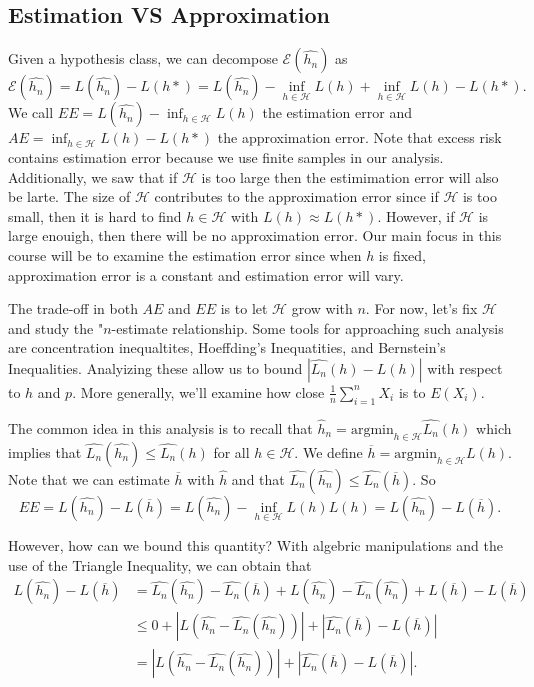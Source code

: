 \documentclass[
]{article}
\begin{document}
\hypertarget{estimation-vs-approximation}{%
\subsection{Estimation VS
Approximation}\label{estimation-vs-approximation}}

Given a hypothesis class, we can decompose \(\mathcal{E}(\hat{h_n})\) as
\[\mathcal{E}(\hat{h_n}) = L(\hat{h_n})- L(h*)=L(\hat{h_n})-\inf_{h \in \mathcal{H}} L(h) + \inf_{h \in \mathcal{H}} L(h) -L(h*).\]
We call \(EE=L(\hat{h_n})-\inf_{h \in \mathcal{H}} L(h)\) the estimation
error and \(AE=\inf_{h \in \mathcal{H}} L(h) -L(h*)\) the approximation
error. Note that excess risk contains estimation error because we use
finite samples in our analysis. Additionally, we saw that if
\(\mathcal{H}\) is too large then the estimimation error will also be
larte. The size of \(\mathcal{H}\) contributes to the approximation
error since if \(\mathcal{H}\) is too small, then it is hard to find
\(h \in \mathcal{H}\) with \(L(h) \approx L(h*)\). However, if
\(\mathcal{H}\) is large enouigh, then there will be no approximation
error. Our main focus in this course will be to examine the estimation
error since when \(h\) is fixed, approximation error is a constant and
estimation error will vary.

The trade-off in both \(AE\) and \(EE\) is to let \(\mathcal{H}\) grow
with \(n\). For now, let's fix \(\mathcal{H}\) and study the
"\(n\)-estimate relationship. Some tools for approaching such analysis
are concentration inequaltites, Hoeffding's Inequatities, and
Bernstein's Inequalities. Analyizing these allow us to bound
\(|\hat{L_n}(h)-L(h)|\) with respect to \(h\) and \(p\). More generally,
we'll examine how close \(\frac{1}{n} \sum_{i=1}^n X_i\) is to
\(E(X_i)\).

The common idea in this analysis is to recall that
\(\hat{h}_n = \text{argmin}_{h \in \mathcal{H}} \hat{L_n}(h)\) which
implies that \(\hat{L_n}(\hat{h_n}) \leq \hat{L_n}(h)\) for all
\(h \in \mathcal{H}\). We define
\(\overline{h} = \text{argmin}_{h \in \mathcal{H}} L(h)\). Note that we
can estimate \(\overline{h}\) with \(\hat{h}\) and that
\(\hat{L_n}(\hat{h_n}) \leq \hat{L_n} ( \overline{h})\). So
\[EE=L(\hat{h_n})-L(\overline{h})=L(\hat{h_n})-\inf_{h \in \mathcal{H}} L(h) L(h) = L(\hat{h_n})-L(\overline{h}).\]

However, how can we bound this quantity? With algebric manipulations and
the use of the Triangle Inequality, we can obtain that \begin{align*}
L(\hat{h_n})-L(\overline{h}) &= \hat{L_n}(\hat{h_n}) - \hat{L_n}(\overline{h}) + L(\hat{h_n})-\hat{L_n}(\hat{h_n})+L(\overline{h})-L(\overline{h})\\
&\leq 0 + |L(\hat{h_n}-\hat{L_n}(\hat{h_n}))| + |\hat{L_n}(\overline{h})-L(\overline{h})|\\
&= |L(\hat{h_n}-\hat{L_n}(\hat{h_n}))| + |\hat{L_n}(\overline{h})-L(\overline{h})|.
\end{align*}
\end{document}
